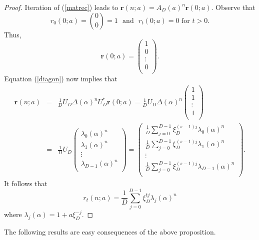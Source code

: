 \begin{proof}
Iteration of (\ref{matrec}) leads to $\boldsymbol{r}(n;a)= A_D(a)^n\boldsymbol{r}(0;a)$.  Observe that
\begin{equation}
 r_0(0;a)=\binom{0}{0} = 1 \,\, \text{ and }\,\, r_t(0;a)=0 \text{ for }t>0.
\end{equation}
Thus,
\begin{equation}
\boldsymbol{r}(0;a)=\left(\begin{array}{c}
 1 \\
 0 \\
 \vdots \\
 0 \\
\end{array}
\right).
\end{equation}
Equation (\ref{diagon}) now implies that 
\begin{eqnarray}
 \boldsymbol{r}(n;a) &=& \frac{1}{D} U_D \Delta(\alpha)^n U_D^* \boldsymbol{r}(0;a)=\frac{1}{D} U_D \Delta(\alpha)^n\left(\begin{array}{c}
 1 \\
 1 \\
 \vdots \\
 1 \\
\end{array}
\right)\\\nonumber
&=& \frac{1}{D} U_D \left(\begin{array}{c}
 \lambda_0(\alpha)^n \\
 \lambda_1(\alpha)^n \\
 \vdots \\
 \lambda_{D-1}(\alpha)^n \\
\end{array}
\right)= \left(\begin{array}{c}
 \frac{1}{D}\sum_{j=0}^{D-1}\xi_D^{(s-1)j}\lambda_0(\alpha)^n\\
 \frac{1}{D}\sum_{j=0}^{D-1}\xi_D^{(s-1)j}\lambda_1(\alpha)^n\\
 \vdots \\
 \frac{1}{D}\sum_{j=0}^{D-1}\xi_D^{(s-1)j}\lambda_{D-1}(\alpha)^n\\
\end{array}
\right).
\end{eqnarray}
It follows that 
\begin{equation}
 r_t(n;a)=\frac{1}{D}\sum_{j=0}^{D-1}\xi_D^{tj}\lambda_{j}(\alpha)^n
\end{equation}
where $\lambda_j(\alpha) = 1+a\xi_D^{-j}$.
\end{proof}

The following results are easy consequences of the above proposition.


